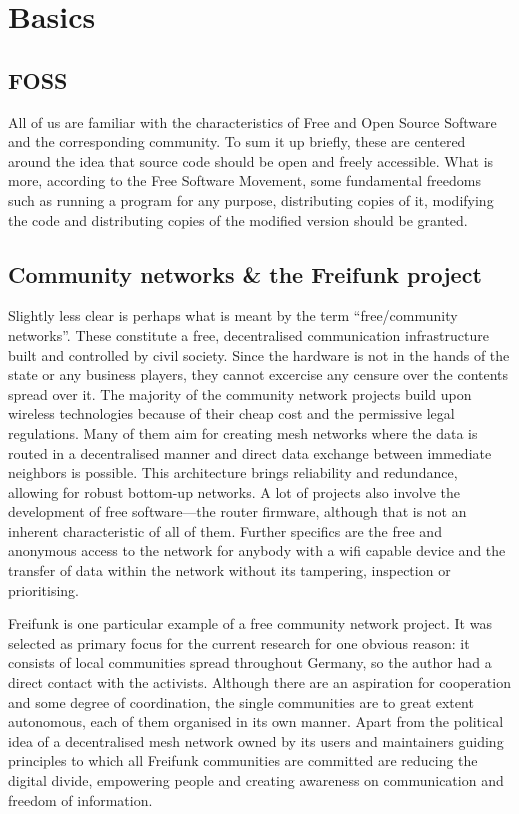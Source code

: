 \section{Basics}
\subsection{FOSS}
All of us are familiar with the characteristics of Free and Open Source Software and the corresponding community.
To sum it up briefly, these are centered around the idea that source code should be open and freely accessible.
What is more, according to the Free Software Movement,
some fundamental freedoms such as running a program for any purpose, distributing copies of it, modifying the code and distributing copies of the modified version should be granted\cite{gnuweb}.


\subsection{Community networks \& the Freifunk project}
Slightly less clear is perhaps what is meant by the term ``free/community networks''.
These constitute a free, decentralised communication infrastructure built and controlled by civil society.
Since the hardware is not in the hands of the state or any business players, they cannot excercise any censure over the contents spread over it. %
The majority of the community network projects build upon wireless technologies because of their cheap cost and the permissive legal regulations\cite{WNDW2013}\cite{Medosch2004}.
Many of them aim for creating mesh networks where the data is routed in a decentralised manner and direct data exchange between immediate neighbors is possible.
This architecture brings reliability and redundance, allowing for robust bottom-up networks\cite{Medosch2004}.
A lot of projects also involve the development of free software---the router firmware, although that is not an inherent characteristic of all of them.
Further specifics are the free and anonymous access to the network for anybody with a wifi capable device and the transfer of data within the network without its tampering, inspection or prioritising\cite{ffweb}\cite{Medosch2004}. %

Freifunk is one particular example of a free community network project.
It was selected as primary focus for the current research for one obvious reason: it consists of local communities spread throughout Germany, so the author had a direct contact with the activists.
Although there are an aspiration for cooperation and some degree of coordination, the single communities are to great extent autonomous, each of them organised in its own manner.
Apart from the political idea of a decentralised mesh network owned by its users and maintainers guiding principles to which all Freifunk communities are committed are reducing the digital divide, empowering people and creating awareness on communication and freedom of information\cite{ffweb}.

